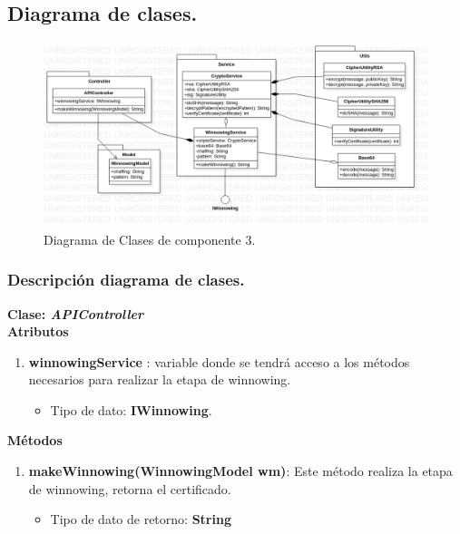 \documentclass[12pt, a4paper, titlepage]{report}
\begin{document}
            \subsection{Diagrama de clases.}
            
                \begin{figure}[H]
                	\begin{center}	\includegraphics[width=14cm]{./imagenes/Disenio/Componente_3/CIII_CD.png}
                	\caption{Diagrama de Clases de componente 3.}
                	\end{center}
        		\end{figure}      
            
                \subsubsection{Descripción diagrama de clases.}
               
                \textbf{\textcolor{guindapoli}{Clase: \textit{APIController}}}\\
                    
                    \textbf{Atributos}
                    \begin{enumerate}
    		            \item \textbf{winnowingService} : variable donde se tendrá acceso a los métodos necesarios para realizar la etapa de winnowing.
        		        \begin{itemize}
        		            \item Tipo de dato: \textbf{IWinnowing}.
        		        \end{itemize}
                    \end{enumerate}
                    
		            \textbf{Métodos}
    		        \begin{enumerate}
    		            \item \textbf{makeWinnowing(WinnowingModel wm)}: Este método realiza la etapa de winnowing, retorna el certificado.
    		            \begin{itemize}
    		                \item Tipo de dato de retorno: \textbf{String}
    		            \end{itemize}
    		        \end{enumerate}
			    
\end{document}
